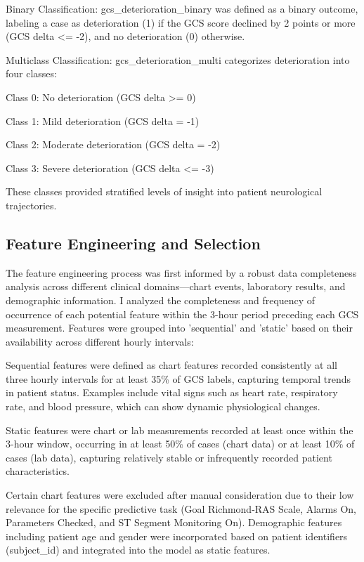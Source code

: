 \documentclass[conference]{IEEEtran}
\begin{document}
Binary Classification: gcs\_deterioration\_binary was defined as a binary outcome, labeling a case as deterioration (1) if the GCS score declined by 2 points or more (GCS delta <= -2), and no deterioration (0) otherwise.

Multiclass Classification: gcs\_deterioration\_multi categorizes deterioration into four classes:

Class 0: No deterioration (GCS delta >= 0)

Class 1: Mild deterioration (GCS delta = -1)

Class 2: Moderate deterioration (GCS delta = -2)

Class 3: Severe deterioration (GCS delta <= -3)

These classes provided stratified levels of insight into patient neurological trajectories.

\subsection{Feature Engineering and Selection}

The feature engineering process was first informed by a robust data completeness analysis across different clinical domains—chart events, laboratory results, and demographic information. I analyzed the completeness and frequency of occurrence of each potential feature within the 3-hour period preceding each GCS measurement. Features were grouped into 'sequential' and 'static' based on their availability across different hourly intervals:

Sequential features were defined as chart features recorded consistently at all three hourly intervals for at least 35\% of GCS labels, capturing temporal trends in patient status. Examples include vital signs such as heart rate, respiratory rate, and blood pressure, which can show dynamic physiological changes.

Static features were chart or lab measurements recorded at least once within the 3-hour window, occurring in at least 50\% of cases (chart data) or at least 10\% of cases (lab data), capturing relatively stable or infrequently recorded patient characteristics.

Certain chart features were excluded after manual consideration due to their low relevance for the specific predictive task (Goal Richmond-RAS Scale, Alarms On, Parameters Checked, and ST Segment Monitoring On). Demographic features including patient age and gender were incorporated based on patient identifiers (subject\_id) and integrated into the model as static features.
\end{document}

